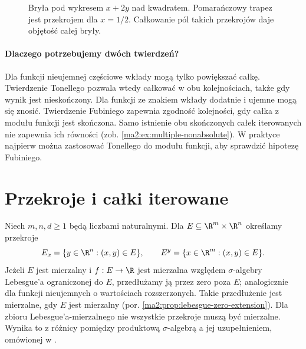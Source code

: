 \begin{figure}[htbp]
\centering
{}
\caption{Bryła pod wykresem $x+2y$ nad kwadratem.
Pomarańczowy trapez jest przekrojem
dla $x=1/2$. Całkowanie pól takich przekrojów
daje objętość całej bryły.}
\label{ma2:fig:multiple-section-volume}
\end{figure}

\paragraph{Dlaczego potrzebujemy dwóch twierdzeń?}
Dla funkcji nieujemnej częściowe wkłady
mogą tylko powiększać całkę. Twierdzenie
Tonellego pozwala wtedy całkować w obu
kolejnościach, także gdy wynik jest
nieskończony. Dla funkcji ze znakiem
wkłady dodatnie i ujemne mogą się znosić.
Twierdzenie Fubiniego zapewnia zgodność
kolejności, gdy całka z modułu funkcji
jest skończona. Samo istnienie obu
skończonych całek iterowanych nie
zapewnia ich równości (zob.
\ref{ma2:ex:multiple-nonabsolute}).
W praktyce najpierw można zastosować
Tonellego do modułu funkcji, aby sprawdzić
hipotezę Fubiniego.

\section{Przekroje i całki iterowane}

Niech $m,n,d\ge1$ będą liczbami naturalnymi.
Dla $E\subseteq\R^m\times\R^n$ określamy przekroje
\[
 E_x=\{y\in\R^n:(x,y)\in E\},\qquad
 E^y=\{x\in\R^m:(x,y)\in E\}.
\]
Jeżeli $E$ jest mierzalny i $f:E\to\R$ jest
mierzalna względem $\sigma$-algebry Lebesgue'a
ograniczonej do $E$, przedłużamy ją przez zero
poza $E$; analogicznie dla funkcji
nieujemnych o wartościach rozszerzonych.
Takie przedłużenie jest mierzalne, gdy $E$ jest
mierzalny (por. \ref{ma2:prop:lebesgue-zero-extension}).
Dla zbioru Lebesgue'a-mierzalnego nie wszystkie
przekroje muszą być mierzalne. Wynika to z różnicy
pomiędzy produktową $\sigma$-algebrą a jej uzupełnieniem,
omówionej w .

